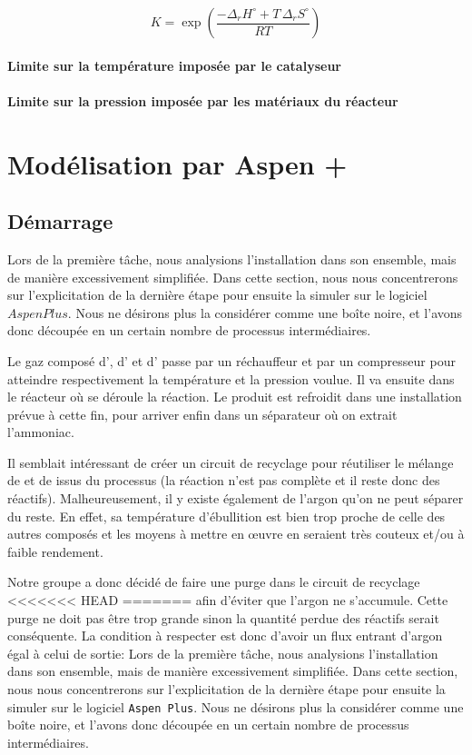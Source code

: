 \documentclass[a4paper, oneside, 12pt]{article}
\begin{document}
\[
K = \exp{\left( \frac{- \Delta_r H^{\circ} + T \, \Delta_r S^{\circ}}{R T}\right)}
\]

\paragraph{Limite sur la température imposée par le catalyseur}

\paragraph{Limite sur la pression imposée par les matériaux du réacteur}

\section{Modélisation par Aspen +}
\subsection{Démarrage}

Lors de la première tâche, nous analysions l'installation dans son ensemble, 
mais de manière excessivement simplifiée. 
Dans cette section, nous nous concentrerons sur l'explicitation de la dernière étape 
pour ensuite la simuler sur le logiciel $Aspen Plus$. 
Nous ne désirons plus la considérer comme une boîte noire, et l'avons donc découpée 
en un certain nombre de processus intermédiaires. 

Le gaz composé d', d' et d' passe par un réchauffeur et par un compresseur 
pour atteindre respectivement la température et la pression voulue. 
Il va ensuite dans le réacteur où se déroule la réaction.
Le produit est refroidit dans une installation prévue à cette fin, 
pour arriver enfin dans un séparateur où on extrait l'ammoniac.

Il semblait intéressant de créer un circuit de recyclage pour réutiliser 
le mélange de  et de  issus du processus (la réaction n'est pas complète 
et il reste donc des réactifs). Malheureusement, il y existe également de l'argon 
qu'on ne peut séparer du reste. En effet, sa température d'ébullition est bien trop 
proche de celle des autres composés et les moyens à mettre en œuvre en seraient 
très couteux et/ou à faible rendement.

Notre groupe a donc décidé de faire une purge dans le circuit de recyclage 
<<<<<<< HEAD
=======
afin d'éviter que l'argon ne s'accumule. Cette purge ne doit pas être trop 
grande sinon la quantité perdue des réactifs serait conséquente. 
La condition à respecter est donc d'avoir un flux entrant d'argon égal à celui de sortie:
Lors de la première tâche, nous analysions l'installation dans son ensemble, 
mais de manière excessivement simplifiée. Dans cette section, 
nous nous concentrerons sur l'explicitation de la dernière étape pour 
ensuite la simuler sur le logiciel \texttt{Aspen Plus}. 
Nous ne désirons plus la considérer comme une boîte noire, 
et l'avons donc découpée en un certain nombre de processus intermédiaires.
\end{document}
